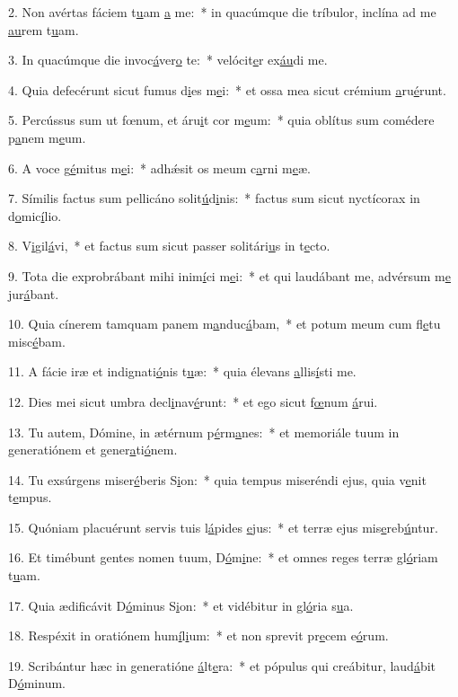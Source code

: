 2. Non avértas fáciem t\uline{u}am \uline{a} me:~* in quacúmque die tríbulor, inclína ad me \uline{au}rem t\uline{u}am.\par 
3. In quacúmque die invoc\uline{á}ver\uline{o} te:~* velócit\uline{e}r ex\uline{áu}di me.\par 
4. Quia defecérunt sicut fumus d\uline{i}es m\uline{e}i:~* et ossa mea sicut crémium \uline{a}ru\uline{é}runt.\par 
5. Percússus sum ut fœnum, et áru\uline{i}t cor m\uline{e}um:~* quia oblítus sum comédere p\uline{a}nem m\uline{e}um.\par 
6. A voce g\uline{é}mitus m\uline{e}i:~* adhǽsit os meum c\uline{a}rni m\uline{e}æ.\par 
7. Símilis factus sum pellicáno solit\uline{ú}d\uline{i}nis:~* factus sum sicut nyctícorax in d\uline{o}mic\uline{í}lio.\par 
8. V\uline{i}gil\uline{á}vi,~* et factus sum sicut passer solitári\uline{u}s in t\uline{e}cto.\par 
9. Tota die exprobrábant mihi inim\uline{í}ci m\uline{e}i:~* et qui laudábant me, advérsum m\uline{e} jur\uline{á}bant.\par 
10. Quia cínerem tamquam panem m\uline{a}nduc\uline{á}bam,~* et potum meum cum fl\uline{e}tu misc\uline{é}bam.\par 
11. A fácie iræ et indignati\uline{ó}nis t\uline{u}æ:~* quia élevans \uline{a}llis\uline{í}sti me.\par 
12. Dies mei sicut umbra decl\uline{i}nav\uline{é}runt:~* et ego sicut f\uline{œ}num \uline{á}rui.\par 
13. Tu autem, Dómine, in ætérnum p\uline{é}rm\uline{a}nes:~* et memoriále tuum in generatiónem et gener\uline{a}ti\uline{ó}nem.\par 
14. Tu exsúrgens miser\uline{é}beris S\uline{i}on:~* quia tempus miseréndi ejus, quia v\uline{e}nit t\uline{e}mpus.\par 
15. Quóniam placuérunt servis tuis l\uline{á}pides \uline{e}jus:~* et terræ ejus mis\uline{e}reb\uline{ú}ntur.\par 
16. Et timébunt gentes nomen tuum, D\uline{ó}m\uline{i}ne:~* et omnes reges terræ gl\uline{ó}riam t\uline{u}am.\par 
17. Quia ædificávit D\uline{ó}minus S\uline{i}on:~* et vidébitur in gl\uline{ó}ria s\uline{u}a.\par 
18. Respéxit in oratiónem hum\uline{í}l\uline{i}um:~* et non sprevit pr\uline{e}cem e\uline{ó}rum.\par 
19. Scribántur hæc in generatióne \uline{á}lt\uline{e}ra:~* et pópulus qui creábitur, laud\uline{á}bit D\uline{ó}minum.\par 
